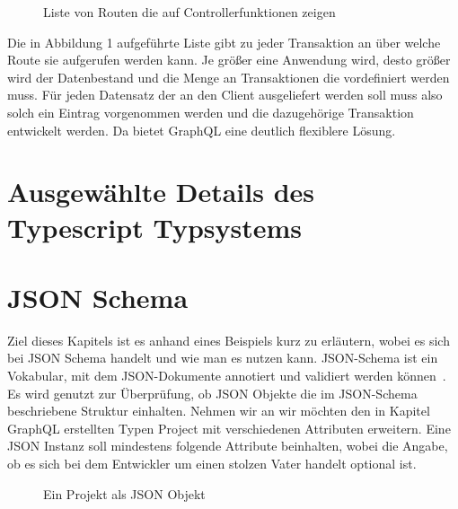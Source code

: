 \begin{figure}[h]
    
    \caption{Liste von Routen die auf Controllerfunktionen zeigen}
    \label{fig:basics:graphql:6}
\end{figure}

Die in Abbildung 1 aufgeführte Liste gibt zu jeder Transaktion an über welche Route sie aufgerufen werden kann.
Je größer eine Anwendung wird, desto größer wird der Datenbestand und die Menge an Transaktionen die vordefiniert werden muss.
Für jeden Datensatz der an den Client ausgeliefert werden soll muss also solch ein Eintrag vorgenommen werden und die dazugehörige Transaktion entwickelt werden.
Da bietet GraphQL eine deutlich flexiblere Lösung.



\section{Ausgewählte Details des Typescript Typsystems}

\section{JSON Schema}
\label{sec:basics:jsonschema}
Ziel dieses Kapitels ist es anhand eines Beispiels kurz zu erläutern, wobei es sich bei JSON Schema handelt und wie man es nutzen kann.
JSON-Schema ist ein Vokabular, mit dem JSON-Dokumente  annotiert und validiert werden können~\cite{json-schema}.
Es wird genutzt zur Überprüfung, ob JSON Objekte die im JSON-Schema beschriebene Struktur einhalten.
Nehmen wir an wir möchten den in Kapitel GraphQL erstellten Typen Project mit verschiedenen Attributen erweitern.
Eine JSON Instanz soll mindestens folgende Attribute beinhalten, wobei die Angabe, ob es sich bei dem Entwickler
um einen stolzen Vater handelt optional ist.

\begin{figure}[h]
    
    \caption{Ein Projekt als JSON Objekt}
    \label{fig:basics:jsonschema:1}
\end{figure}

